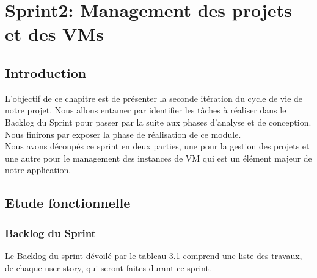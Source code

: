 
\chapter{Sprint2: Management des projets et des VMs}
\section {Introduction}
L'objectif de ce chapitre est de présenter la seconde itération du cycle de vie de notre
projet. Nous allons entamer par identifier les tâches à réaliser dans le Backlog du Sprint pour
passer par la suite aux phases d'analyse et de conception. Nous finirons par exposer la phase de
réalisation de ce module.\\
Nous avons découpés ce sprint en deux parties, une pour la gestion des projets et une autre pour le management des instances de VM qui est un élément majeur de notre application.

\section{Etude fonctionnelle}
\subsection{Backlog du Sprint} 
Le Backlog du sprint dévoilé par le tableau 3.1 comprend une liste des travaux, de chaque user story, qui seront faites durant ce sprint.



